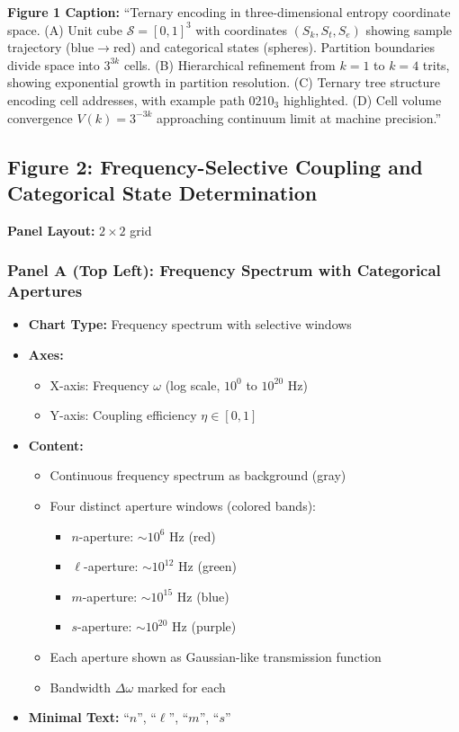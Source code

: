 \textbf{Figure 1 Caption:}
``Ternary encoding in three-dimensional entropy coordinate space. (A) Unit cube $\mathcal{S}=[0,1]^3$ with coordinates $(S_k,S_t,S_e)$ showing sample trajectory (blue$\to$red) and categorical states (spheres). Partition boundaries divide space into $3^{3k}$ cells. (B) Hierarchical refinement from $k=1$ to $k=4$ trits, showing exponential growth in partition resolution. (C) Ternary tree structure encoding cell addresses, with example path 0210$_3$ highlighted. (D) Cell volume convergence $V(k)=3^{-3k}$ approaching continuum limit at machine precision.''


\subsection*{Figure 2: Frequency-Selective Coupling and Categorical State Determination}

\textbf{Panel Layout:} $2 \times 2$ grid

\subsubsection*{Panel A (Top Left): Frequency Spectrum with Categorical Apertures}
\begin{itemize}
\item \textbf{Chart Type:} Frequency spectrum with selective windows
\item \textbf{Axes:}
  \begin{itemize}
  \item X-axis: Frequency $\omega$ (log scale, $10^0$ to $10^{20}$ Hz)
  \item Y-axis: Coupling efficiency $\eta \in [0,1]$
  \end{itemize}
\item \textbf{Content:}
  \begin{itemize}
  \item Continuous frequency spectrum as background (gray)
  \item Four distinct aperture windows (colored bands):
    \begin{itemize}
    \item $n$-aperture: $\sim 10^6$ Hz (red)
    \item $\ell$-aperture: $\sim 10^{12}$ Hz (green)
    \item $m$-aperture: $\sim 10^{15}$ Hz (blue)
    \item $s$-aperture: $\sim 10^{20}$ Hz (purple)
    \end{itemize}
  \item Each aperture shown as Gaussian-like transmission function
  \item Bandwidth $\Delta\omega$ marked for each
  \end{itemize}
\item \textbf{Minimal Text:} ``$n$'', ``$\ell$'', ``$m$'', ``$s$''
\end{itemize}

